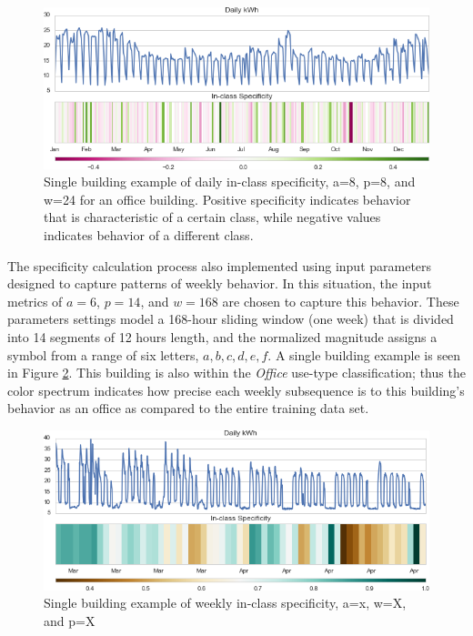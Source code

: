 \begin{figure}[ht!]
\begin{center}
\includegraphics[width=1\columnwidth]{figures/jmotif_alldatatrained_dailyspecificity_example_24_8_8/jmotif_alldatatrained_dailyspecificity_example_24_8_8}
\caption{Single building example of daily in-class specificity, a=8, p=8, and w=24 for an office building. Positive specificity indicates behavior that is characteristic of a certain class, while negative values indicates behavior of a different class.
\label{fig:dailyspecificity_single}%
}
\end{center}
\end{figure}

The specificity calculation process also implemented using input parameters designed to capture patterns of weekly behavior. In this situation, the input metrics of $a=6$, $p=14$, and $w=168$ are chosen to capture this behavior. These parameters settings model a 168-hour sliding window (one week) that is divided into 14 segments of 12 hours length, and the normalized magnitude assigns a symbol from a range of six letters, $a,b,c,d,e,f$. A single building example is seen in Figure \ref{fig:weeklyspecificity_single}. This building is also within the \emph{Office} use-type classification; thus the color spectrum indicates how precise each weekly subsequence is to this building's behavior as an office as compared to the entire training data set.

\begin{figure}[ht!]
\begin{center}
\includegraphics[width=1\columnwidth]{figures/jmotif_alldatatrained_dailyspecificity_example_168_6_14/jmotif_alldatatrained_dailyspecificity_example_168_6_14}
\caption{Single building example of weekly in-class specificity, a=x, w=X, and p=X
\label{fig:weeklyspecificity_single}%
}
\end{center}
\end{figure}

